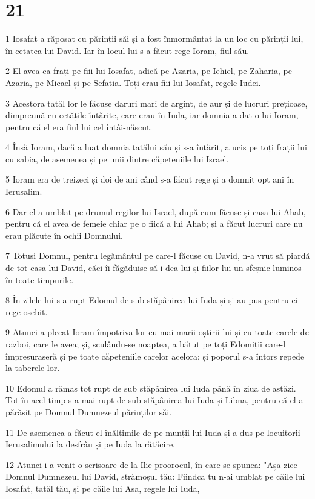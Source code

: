 \chapter{21}

\par 1 Iosafat a răposat cu părinții săi și a fost înmormântat la un loc cu părinții lui, în cetatea lui David. Iar în locul lui s-a făcut rege Ioram, fiul său.
\par 2 El avea ca frați pe fiii lui Iosafat, adică pe Azaria, pe Iehiel, pe Zaharia, pe Azaria, pe Micael și pe Șefatia. Toți erau fiii lui Iosafat, regele Iudei.
\par 3 Acestora tatăl lor le făcuse daruri mari de argint, de aur și de lucruri prețioase, dimpreună cu cetățile întărite, care erau în Iuda, iar domnia a dat-o lui Ioram, pentru că el era fiul lui cel întâi-născut.
\par 4 Însă Ioram, dacă a luat domnia tatălui său și s-a întărit, a ucis pe toți frații lui cu sabia, de asemenea și pe unii dintre căpeteniile lui Israel.
\par 5 Ioram era de treizeci și doi de ani când s-a făcut rege și a domnit opt ani în Ierusalim.
\par 6 Dar el a umblat pe drumul regilor lui Israel, după cum făcuse și casa lui Ahab, pentru că el avea de femeie chiar pe o fiică a lui Ahab; și a făcut lucruri care nu erau plăcute în ochii Domnului.
\par 7 Totuși Domnul, pentru legământul pe care-l făcuse cu David, n-a vrut să piardă de tot casa lui David, căci îi făgăduise să-i dea lui și fiilor lui un sfeșnic luminos în toate timpurile.
\par 8 În zilele lui s-a rupt Edomul de sub stăpânirea lui Iuda și și-au pus pentru ei rege osebit.
\par 9 Atunci a plecat Ioram împotriva lor cu mai-marii oștirii lui și cu toate carele de război, care le avea; și, sculându-se noaptea, a bătut pe toți Edomiții care-l împresuraseră și pe toate căpeteniile carelor acelora; și poporul s-a întors repede la taberele lor.
\par 10 Edomul a rămas tot rupt de sub stăpânirea lui Iuda până în ziua de astăzi. Tot în acel timp s-a mai rupt de sub stăpânirea lui Iuda și Libna, pentru că el a părăsit pe Domnul Dumnezeul părinților săi.
\par 11 De asemenea a făcut el înălțimile de pe munții lui Iuda și a dus pe locuitorii Ierusalimului la desfrâu și pe Iuda la rătăcire.
\par 12 Atunci i-a venit o scrisoare de la Ilie proorocul, în care se spunea: "Așa zice Domnul Dumnezeul lui David, strămoșul tău: Fiindcă tu n-ai umblat pe căile lui Iosafat, tatăl tău, și pe căile lui Asa, regele lui Iuda,
